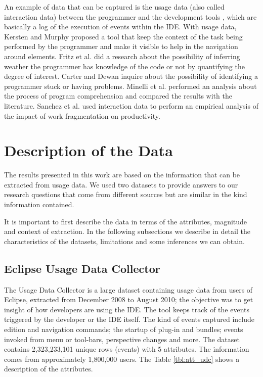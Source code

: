 \documentclass[conference]{IEEEtran}
\begin{document}
An example of data that can be captured is the usage data (also called interaction data) between the programmer and the development tools \cite{SnipesETALASD}, which are basically a log of the execution of events within the IDE. With usage data, Kersten and Murphy \cite{KM06} proposed a tool that keep the context of the task being performed by the programmer and make it visible to help in the navigation around elements. Fritz et al. \cite{FMH07} did a research about the possibility of inferring weather the programmer has knowledge of the code or not by quantifying the degree of interest. Carter and Dewan \cite{CD10} inquire about the possibility of identifying a programmer stuck or having problems. Minelli et al. \cite{MMLK14} performed an analysis about the process of program comprehension and compared the results with the literature. Sanchez et al. \cite{SRV15} used interaction data to perform an empirical analysis of the impact of work fragmentation on productivity.

\section{Description of the Data}
The results presented in this work are based on the information that can be extracted from usage data. We used two datasets to provide answers to our research questions that come from different sources but are similar in the kind information contained. 

It is important to first describe the data in terms of the attributes, magnitude and context of extraction. In the following subsections we describe in detail the characteristics of the datasets, limitations and some inferences we can obtain.

\subsection{Eclipse Usage Data Collector}
The Usage Data Collector is a large dataset containing usage data from users of Eclipse, extracted from December 2008 to August 2010; the objective was to get insight of how developers are using the IDE. The tool keeps track of the events triggered by the developer or the IDE itself. The kind of events captured include edition and navigation commands; the startup of plug-in and bundles; events invoked from menu or tool-bars, perspective changes and more. The dataset contains 2,323,233,101 unique rows (events) with 5 attributes. The information comes from approximately 1,800,000 users. The Table \ref{tbl:att_udc} shows a description of the attributes.
\end{document}
